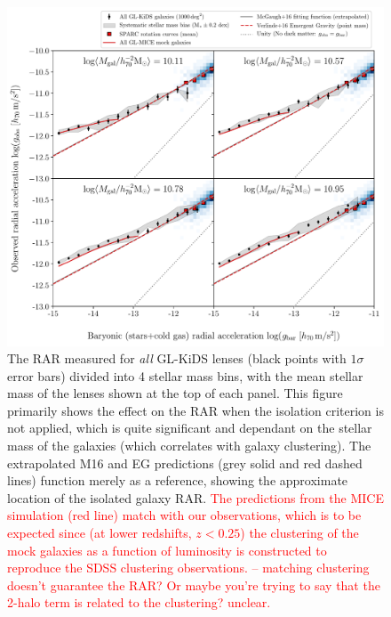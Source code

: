 \documentclass[usenatbib]{mnras}
\begin{document}
\begin{figure}
	\includegraphics[width=\textwidth]{Figures/RAR_KiDS+MICE+Verlinde_4-massbins_all.pdf}
	\caption{The RAR measured for \emph{all} GL-KiDS lenses (black points with $1\sigma$ error bars) divided into 4 stellar mass bins, with the mean stellar mass of the lenses shown at the top of each panel. This figure primarily shows the effect on the RAR when the isolation criterion is not applied, which is quite significant and dependant on the stellar mass of the galaxies (which correlates with galaxy clustering). The extrapolated M16 and EG predictions (grey solid and red dashed lines) function merely as a reference, showing the approximate location of the isolated galaxy RAR. \textcolor{red}{The predictions from the MICE simulation (red line) match with our observations, which is to be expected since (at lower redshifts, $z<0.25$) the clustering of the mock galaxies as a function of luminosity is constructed to reproduce the SDSS clustering observations. -- matching clustering doesn't guarantee the RAR? Or maybe you're trying to say that the 2-halo term is related to the clustering? unclear.}}
	\label{fig:RAR_kids_mice_mstarbins_all}
\end{figure}
\end{document}
